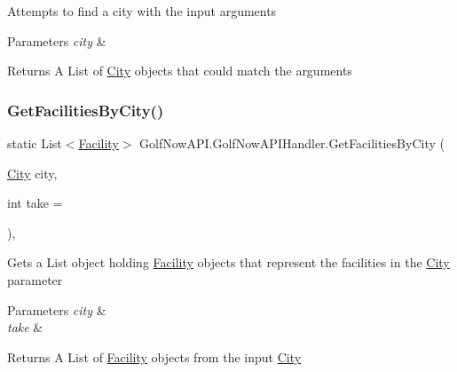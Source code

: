Attempts to find a city with the input arguments 


\begin{DoxyParams}{Parameters}
{\em city} & \\
\hline
\end{DoxyParams}
\begin{DoxyReturn}{Returns}
A List of \mbox{\hyperlink{class_golf_now_a_p_i_1_1_city}{City}} objects that could match the arguments
\end{DoxyReturn}
\mbox{\label{class_golf_now_a_p_i_1_1_golf_now_a_p_i_handler_aaa4165dc6e7f348d02ba4dadfac977c3}} 
\subsubsection{\texorpdfstring{GetFacilitiesByCity()}{GetFacilitiesByCity()}}
{\footnotesize\ttfamily static List$<$\mbox{\hyperlink{class_golf_now_a_p_i_1_1_facility}{Facility}}$>$ Golf\+Now\+A\+P\+I.\+Golf\+Now\+A\+P\+I\+Handler.\+Get\+Facilities\+By\+City (\begin{DoxyParamCaption}\item[{\mbox{\hyperlink{class_golf_now_a_p_i_1_1_city}{City}}}]{city,  }\item[{int}]{take = {} }\end{DoxyParamCaption})\hspace{0.3cm}{\ttfamily [inline]}, {\ttfamily [static]}}



Gets a List object holding \mbox{\hyperlink{class_golf_now_a_p_i_1_1_facility}{Facility}} objects that represent the facilities in the \mbox{\hyperlink{class_golf_now_a_p_i_1_1_city}{City}} parameter 


\begin{DoxyParams}{Parameters}
{\em city} & \\
\hline
{\em take} & \\
\hline
\end{DoxyParams}
\begin{DoxyReturn}{Returns}
A List of \mbox{\hyperlink{class_golf_now_a_p_i_1_1_facility}{Facility}} objects from the input \mbox{\hyperlink{class_golf_now_a_p_i_1_1_city}{City}}
\end{DoxyReturn}
\mbox{\label{class_golf_now_a_p_i_1_1_golf_now_a_p_i_handler_a944de1a0c317adc059274c10a7d444cd}} 
